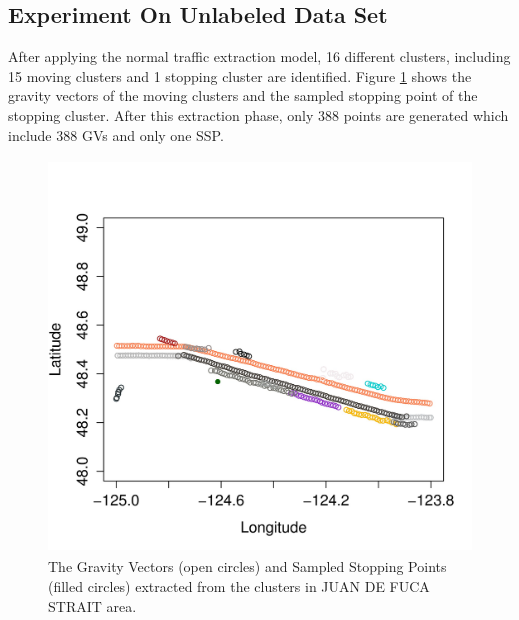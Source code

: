 \documentclass[12pt,glossary]{dalcsthesis}
\begin{document}
\subsection{Experiment On Unlabeled Data Set}
\label{sec:exp_2.1}

After applying the normal traffic extraction model, 16 different clusters, including 15 moving clusters and 1 stopping cluster are identified. %
Figure \ref{fig:jdfk_gv2} shows the gravity vectors of the moving clusters and the sampled stopping point of the stopping cluster. After this extraction phase, only 388 points are generated which include 388 GVs and only one SSP. %

\begin{figure}[!htb]
\centering
\includegraphics[width=5in,height=4.1in]{jdfk_clusters_new.jpg}
\caption{The Gravity Vectors (open circles) and Sampled Stopping Points (filled circles) extracted from the clusters in JUAN DE FUCA STRAIT area.}
\label{fig:jdfk_gv2}
\end{figure}
\end{document}
